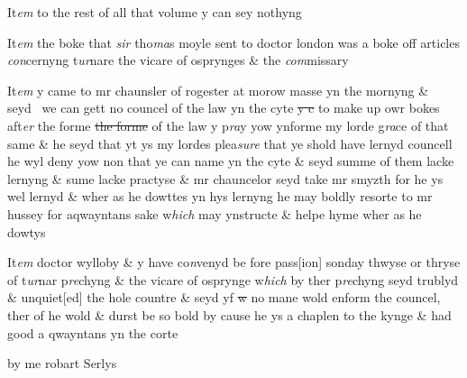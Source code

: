 \documentclass[12pt, a4paper]{book}
\begin{document}
		\ifthenelse{\isodd{\thepage}}
		{\reversemarginpar}
		{\normalmarginpar}
		It\textit{em} to the rest of all that volume y can sey nothyng 

	
		\ifthenelse{\isodd{\thepage}}
		{\reversemarginpar}
		{\normalmarginpar}
		It\textit{em} the boke that \textit{sir} tho\textit{ma}s moyle sent to doctor london was a boke off articles \textit{con}cernyng t\textit{ur}nare the vicare of osprynges \& the\textit{ com}missary 

	
		\ifthenelse{\isodd{\thepage}}
		{\reversemarginpar}
		{\normalmarginpar}
		It\textit{em} y came to mr chaunsler of rogester at morow masse yn the mornyng \& seyd  we can gett no councel of the law yn the cyte \sout{y c} to make up owr bokes aft\textit{er} the forme \sout{the forme} of the law y p\textit{ra}y yow ynforme my lorde g\textit{ra}ce of that same \& he seyd that yt ys my lordes plea\textit{sure }that ye shold have lernyd councell he wyl deny yow non that ye can name yn the cyte \& seyd summe of them lacke lernyng \& sume lacke practyse \& mr chauncelor seyd take mr smyzth for he ys wel lernyd \& wher as he dowttes yn hys lernyng he may boldly resorte to mr hussey for aqwayntans sake w\textit{hich} may ynstructe \& helpe hyme wher as he dowtys
 	

	
		\ifthenelse{\isodd{\thepage}}
		{\reversemarginpar}
		{\normalmarginpar}
		It\textit{em} doctor wylloby \& y have co\textit{n}venyd be fore pass[ion] sonday thwyse or thryse of t\textit{ur}nar p\textit{re}chyng \& the vicare of osprynge w\textit{hich} by ther p\textit{re}chyng seyd trublyd \& unquiet[ed] the hole countre \& seyd yf \sout{w }no mane wold enform the councel, ther of
			 he wold \& durst be so bold by cause he ys a chaplen to the kynge \& had good a qwayntans  yn the corte 
 	
		\ifthenelse{\isodd{\thepage}}
		{\reversemarginpar}
		{\normalmarginpar}
		by me robart Serlys

\dotfill
						\newpage {} \section*{}  \subsection*{}
\end{document}
